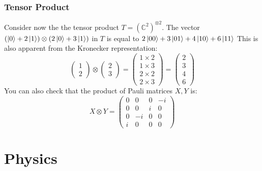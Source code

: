 \documentclass{beamer}
\begin{document}
\begin{frame}
    \frametitle{Tensor Product}
    \begin{example}
        Consider now the the tensor product $T = (\mathbb{C}^2)^{\otimes 2}$.
        The vector $(\ket{0} + 2 \ket{1}) \otimes (2 \ket{0} + 3 \ket{1})$ in $T$ is equal to $ 2 \ket{00} + 3 \ket{01} + 4\ket{10} + 6\ket{11}$
        This is also apparent from the Kronecker representation:
        \begin{equation}
            \begin{pmatrix}
                1 \\
                2
            \end{pmatrix} \otimes
            \begin{pmatrix}
                2 \\
                3
            \end{pmatrix}
            =
            \begin{pmatrix}
                1 \times 2 \\
                1 \times 3 \\
                2 \times 2 \\
                2 \times 3
            \end{pmatrix}
            = \begin{pmatrix}
                2 \\
                3 \\
                4 \\
                6
            \end{pmatrix}
        \end{equation}
        You can also check that the product of Pauli matrices $X, Y$ is:
        \begin{equation}
            X \otimes Y =
            \begin{pmatrix}
                0 & 0  & 0 & -i \\
                0 & 0  & i & 0  \\
                0 & -i & 0 & 0  \\
                i & 0  & 0 & 0
            \end{pmatrix}
        \end{equation}
    \end{example}
\end{frame}
\section{Physics}
\end{document}
